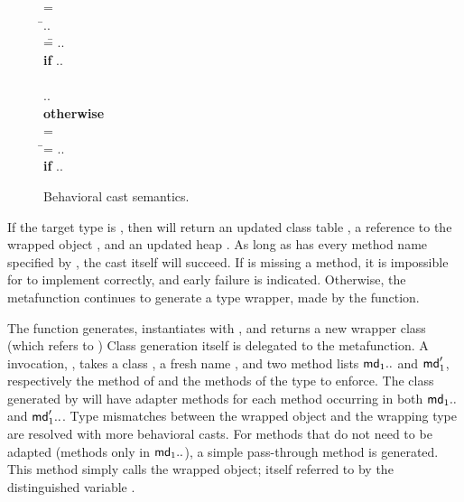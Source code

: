 \documentclass[USenglish]{tex/lipics-v2016}f
\begin{document}
\begin{figure}[!h]
\hspace{8mm}\begin{minipage}{12cm}\begin{tabbing}\small
  \wrap{}\D = \\
  \HS\HS\WHERE\HS\= \Mdef\m\x{\t[1]}{\t[2]}\e\In\md[1].. \\
                 \> \mdpp[1] =\= \src{\Mdef\m\x{\tp[1]}{\tp[2]}{~\BehCast{\tp[2]}{\KCall{\FRead\that}\m{\bscast{\tp[1]}\x}{\t[1]}{\t[2]}}}} .. \\
\> \> \HS\HS \= \textbf{if} \HS \Mdef\m\x{\tp[1]}{\tp[2]}\ep\In\mdp[1].. \\
\\[-3mm]
\> \>  \src{\Mdef\m\x{\t[1]}{\t[2]}{~\KCall{\FRead\that}\m{\x}{\t[1]}{\t[2]}}} .. \\ \> \> \HS\HS \textbf{otherwise}
\\[2mm]
   = \\
\HS\HS\WHERE\HS\=\mdp[1] = \src{ \Mdef\m\x{\any}{\any}{~\BehCast\any{ \KCall{\FRead\that} \m {\bscast{\t}\x}{\t}{\tp}} } }   ..
    \HS\HS\HS\HS \\ \> \> \HS\HS \= \textbf{if} \HS \Mdef\m\x{\t}{\tp}\e\In\md[1].. \\
\end{tabbing}\end{minipage}

\vspace{-2mm}

\hrulefill
\caption{Behavioral cast semantics.}\label{behavetext}
\end{figure}

\newcommand{\W}{\xt{W}\xspace}

If the target type is \Cp, then \behcastS\a\Cp\s\K will return an updated
class table \Kp, a reference to the wrapped object \ap, and an updated heap
\sp. As long as \a has every method name specified by \Cp, the cast itself will
succeed. If \a is missing a method, it is impossible for \a to implement \Cp correctly,
and early failure is indicated. Otherwise, the metafunction continues to generate
a type wrapper, made by the  function.

The  function generates, instantiates with \a, and returns 
a new wrapper class \ap (which refers to \a)
Class generation itself is delegated to the \W metafunction.
A \W invocation, \EM{\W(\C,\md_1..,\mdp_1.., \D)}, takes a
class \C, a fresh name \D, and two method lists $\md_1..$ and $\mdp_1$,
respectively the method of \C and the methods of the type to enforce.  The
class generated by \W will have adapter methods for each method \m occurring in
both $\md_1..$ and $\mdp_1..$. Type mismatches between the wrapped object
and the wrapping type are resolved with more behavioral casts. For methods that do not need to be adapted
(methods only in $\md_1..$), a simple pass-through method is generated. This
method simply calls the wrapped object; itself referred to by the
distinguished variable \that.
\end{document}
